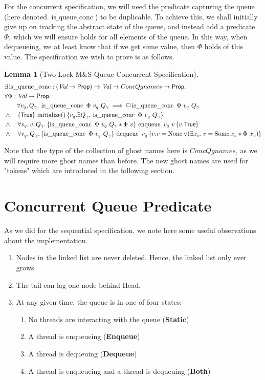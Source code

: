 \documentclass[a4paper, 11pt]{report}
\newtheorem{lemma}[theorem]{Lemma}
\newcommand{\initialise}{\operatorname{initialize}}
\newcommand{\enqueue}{\operatorname{enqueue}}
\newcommand{\dequeue}{\operatorname{dequeue}}
\newcommand{\isqueueconc}{\operatorname{is\_queue\_conc}}
\newcommand{\StaticState}{\textbf{Static}}
\newcommand{\EnqueueState}{\textbf{Enqueue}}
\newcommand{\DequeueState}{\textbf{Dequeue}}
\newcommand{\BothState}{\textbf{Both}}
\newcommand{\tlconcspecinit}{\hoare{\TRUE}{\initialise \TT}{v_q . \Exists Q_\gname. \isqueueconc\ \Phi \ v_q \ Q_\gname}}
\newcommand{\tlconcspecenq}{\All v_q, v, Q_\gname. \hoare{\isqueueconc \ \Phi \ v_q \ Q_\gname \star \Phi \ v}{\enqueue\ v_q\ v}{v . \TRUE}}
\newcommand{\tlconcspecdeq}{\All v_q, Q_\gname. \hoare{\isqueueconc \ \Phi \ v_q \ Q_\gname}{\dequeue\ v_q}{v . v = \None \lor (\Exists x_v. v = \Some x_v \star \Phi \ x_v)}}
\begin{document}
For the concurrent specification, we will need the predicate capturing the queue (here denoted $\isqueueconc$) to be duplicable. To achieve this, we shall initially give up on tracking the abstract state of the queue, and instead add a predicate $\Phi$, which we will ensure holds for all elements of the queue. In this way, when dequeueing, we at least know that if we get some value, then $\Phi$ holds of this value. The specification we wish to prove is as follows.
\begin{lemma}[Two-Lock M\&S-Queue Concurrent Specification]\label{TLMSQ:spec:conc}
\begin{align*}
  &\Exists \isqueueconc : (\Val \to \Prop) \to \Val \to ConcQgnames \to \Prop.\\
  &\All \Phi : \Val \to \Prop.\\
  &\quad\quad \All v_q, Q_\gname . \isqueueconc \ \Phi \ v_q \ Q_\gname \implies \persistently \isqueueconc \ \Phi \ v_q \ Q_\gname\\
  &\land\quad\tlconcspecinit\\
  &\land\quad\tlconcspecenq\\
  &\land\quad\tlconcspecdeq
\end{align*}
\end{lemma}
Note that the type of the collection of ghost names here is $ConcQgnames$, as we will require more ghost names than before. The new ghost names are used for "tokens" which are introduced in the following section.

\section{Concurrent Queue Predicate}
\label{TLMSQCONC:section:conc-queue-pred}

As we did for the sequential specification, we note here some useful observations about the implementation.
\begin{enumerate}
  \item\label{TLMSQ:insights:oldnodes} Nodes in the linked list are never deleted. Hence, the linked list only ever grows.
  \item\label{TLMSQ:insights:lag} The tail can lag one node behind Head.
  \item\label{TLMSQ:insights:states} At any given time, the queue is in one of four states:
    \begin{enumerate}
      \item\label{TLMSQ:insights:state:static} No threads are interacting with the queue (\StaticState)
      \item\label{TLMSQ:insights:state:enqueue} A thread is enqueueing (\EnqueueState)
      \item\label{TLMSQ:insights:state:dequeue} A thread is dequeuing (\DequeueState)
      \item\label{TLMSQ:insights:state:both} A thread is enqueueing and a thread is dequeuing (\BothState)
    \end{enumerate}
\end{enumerate}
\end{document}

